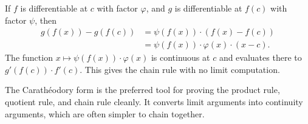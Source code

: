 \begin{remark}
If $f$ is differentiable at $c$ with factor $\varphi$, and $g$ is
differentiable at $f(c)$ with factor $\psi$, then
\begin{align*}
g(f(x)) - g(f(c))
  &= \psi(f(x))\cdot(f(x) - f(c)) \\
  &= \psi(f(x))\cdot\varphi(x)\cdot(x - c).
\end{align*}
The function $x \mapsto \psi(f(x))\cdot\varphi(x)$ is continuous at $c$
and evaluates there to $g'(f(c))\cdot f'(c)$.
This gives the chain rule with no limit computation.
\end{remark}

\begin{remark}
The Carathéodory form is the preferred tool for proving the product rule,
quotient rule, and chain rule cleanly. It converts limit arguments into
continuity arguments, which are often simpler to chain together.
\end{remark}
